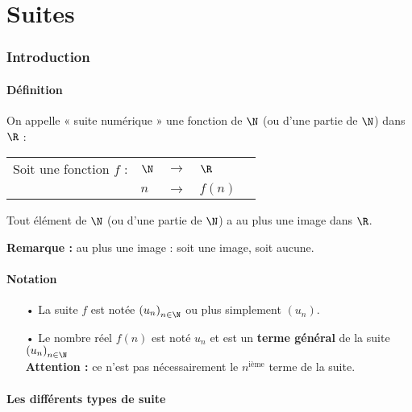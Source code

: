 \setcounter{section}{0}

\part{Suites}

\section{Introduction}

\subsection{Définition}

On appelle « suite numérique » une fonction de $\N$ (ou d'une partie de $\N$) dans $\R$ : \\

\begin{tabular}{lllll}
Soit une fonction $f$ : & $\N$ & $\longrightarrow$ & $\R$ \\
& $n$ & $\longrightarrow$ & $f\left(n\right)$ \\ 
\end{tabular}

\vspace*{.3cm}

Tout élément de $\N$ (ou d'une partie de $\N$) a au plus une image dans $\R$.

\textbf{Remarque :} au plus une image : soit une image, soit aucune. 

\subsection{Notation}

\begin{itemize}
\item[•] La suite $f$ est notée $\left(u_n\right)_{n \in \N}$ ou plus simplement $\left(u_n\right)$. \\

\item[•] Le nombre réel $f\left(n\right)$ est noté $u_n$ et est un \textbf{terme général} de la suite $\left(u_n\right)_{n \in \N}$ \\

\textbf{Attention :} ce n'est pas nécessairement le $n^\mathrm{ième}$ terme de la suite. 
\end{itemize}

\subsection{Les différents types de suite}


